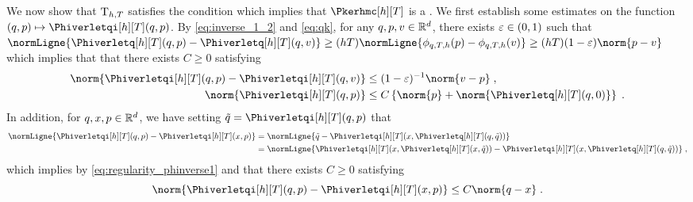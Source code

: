 We now show that $\mathrm{T}_{h,T}$ satisfies the condition which implies that $\Pkerhmc[h][T]$ is a \Tkernel. We first establish some estimates on the function $(q,p) \mapsto \Phiverletqi[h][T](q,p)$. By
\eqref{eq:inverse_1_2} and \eqref{eq:qk}, for any $q,p,v \in \mathbb{R}^d$, there exists $\varepsilon \in \left(0,1\right)$ such that $  \normLigne{\Phiverletq[h][T](q,p)-\Phiverletq[h][T](q,v)} \geq (hT) \normLigne{\phi_{q,T,h}(p)-\phi_{q,T,h}(v)} \geq (hT) (1-\varepsilon)\norm{p-v}$ which implies that that there exists $C \geq 0$ satisfying
\begin{equation}
  \label{eq:regularity_phinverse1}
  \begin{aligned}
    \norm{\Phiverletqi[h][T](q,p)-\Phiverletqi[h][T](q,v)} &\leq (1-\varepsilon)^{-1} \norm{v-p}\eqsp, \\
    \norm{  \Phiverletqi[h][T](q,p)} &\leq C\defEns{\norm{\p} + \norm{\Phiverletq[h][T](q,0)}} \eqsp.
  \end{aligned}
\end{equation}
In addition, for $q,x,p \in \mathbb{R}^d$, we have setting $\tilde{q} = \Phiverletqi[h][T](q,p)$ that
\begin{align}
  \nonumber
  \normLigne{\Phiverletqi[h][T](q,p) - \Phiverletqi[h][T](x,p)} &= \normLigne{\tilde{q} - \Phiverletqi[h][T](x, \Phiverletq[h][T](q,\tilde{q}))} \\
  \nonumber
                                                                &= \normLigne{\Phiverletqi[h][T](x, \Phiverletq[h][T](x,\tilde{q})) - \Phiverletqi[h][T](x, \Phiverletq[h][T](q,\tilde{q}))} \eqsp,
\end{align}
which implies by \eqref{eq:regularity_phinverse1} and 
that there exists $C \geq 0$ satisfying
\begin{equation}
  \label{eq:regularity_phinverse2}
  \norm{\Phiverletqi[h][T](q,p) - \Phiverletqi[h][T](x,p)} \leq C \norm{q-x} \eqsp.
\end{equation}


